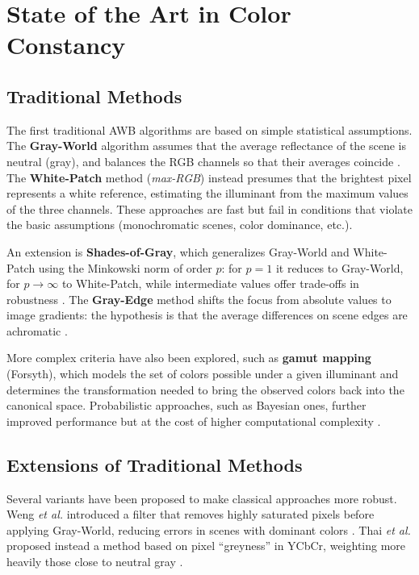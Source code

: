 
\chapter{State of the Art in Color Constancy}

\section{Traditional Methods}\label{sec:traditional_methods} %

The first traditional AWB algorithms are based on simple statistical assumptions.
The \textbf{Gray-World} algorithm assumes that the average reflectance of the scene is neutral (gray), and balances the RGB channels so that their averages coincide \cite{zapryanov_automatic_2012}.
The \textbf{White-Patch} method (\textit{max-RGB}) instead presumes that the brightest pixel represents a white reference, estimating the illuminant from the maximum values of the three channels.
These approaches are fast but fail in conditions that violate the basic assumptions (monochromatic scenes, color dominance, etc.).

An extension is \textbf{Shades-of-Gray}, which generalizes Gray-World and White-Patch using the Minkowski norm of order $p$: for $p=1$ it reduces to Gray-World, for $p\to \infty$ to White-Patch, while intermediate values offer trade-offs in robustness \cite{zapryanov_automatic_2012}.
The \textbf{Gray-Edge} method shifts the focus from absolute values to image gradients: the hypothesis is that the average differences on scene edges are achromatic \cite{van_de_weijer_edge-based_2007}. 

More complex criteria have also been explored, such as \textbf{gamut mapping} (Forsyth), which models the set of colors possible under a given illuminant and determines the transformation needed to bring the observed colors back into the canonical space.
Probabilistic approaches, such as Bayesian ones, further improved performance but at the cost of higher computational complexity \cite{gehler_bayesian_2008}.

\section{Extensions of Traditional Methods}

Several variants have been proposed to make classical approaches more robust. Weng \textit{et al.} introduced a filter that removes highly saturated pixels before applying Gray-World, reducing errors in scenes with dominant colors \cite{weng_novel_2005}. Thai \textit{et al.} proposed instead a method based on pixel “greyness” in YCbCr, weighting more heavily those close to neutral gray \cite{thai_fast_2016}. 

